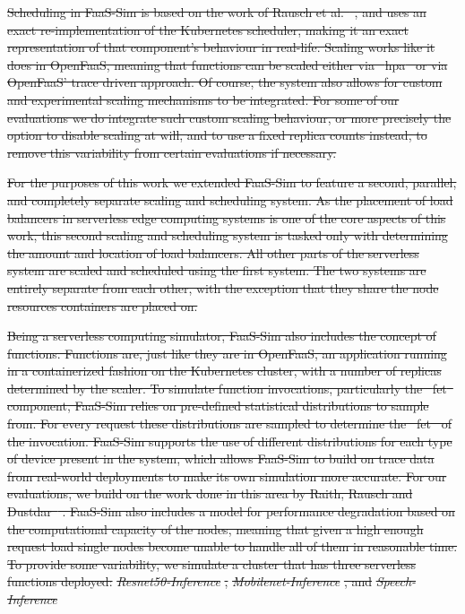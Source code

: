 \documentclass[draft,final]{vutinfth} %
\providecommand{\DIFdeltex}[1]{{\protect\color{red}\sout{#1}}}                      %
\providecommand{\DIFdel}[1]{\texorpdfstring{\DIFdeltex{#1}}{}} %
\begin{document}
\DIFdel{Scheduling in FaaS-Sim is based on the work of Rausch et al.\mbox{%
\cite{skippy}}\hskip0pt%
, and uses an exact re-implementation of the Kubernetes scheduler, making it an exact representation of that component's behaviour in real-life.
Scaling works like it does in OpenFaaS, meaning that functions can be scaled either via \mbox{%
\gls{hpa} }\hskip0pt%
or via OpenFaaS' trace driven approach.
Of course, the system also allows for custom and experimental scaling mechanisms to be integrated.
For some of our evaluations we do integrate such custom scaling behaviour, or more precisely the option to disable scaling at will, and to use a fixed replica counts instead, to remove this variability from certain evaluations if necessary.
}%

\DIFdel{For the purposes of this work we extended FaaS-Sim to feature a second, parallel, and completely separate scaling and scheduling system.
As the placement of load balancers in serverless edge computing systems is one of the core aspects of this work, this second scaling and scheduling system is tasked only with determining the amount and location of load balancers.
All other parts of the serverless system are scaled and scheduled using the first system.
The two systems are entirely separate from each other, with the exception that they share the node resources containers are placed on.
}%

\DIFdel{Being a serverless computing simulator, FaaS-Sim also includes the concept of functions.
Functions are, just like they are in OpenFaaS, an application running in a containerized fashion on the Kubernetes cluster, with a number of replicas determined by the scaler.
To simulate function invocations, particularly the \mbox{%
\gls{fet} }\hskip0pt%
component, FaaS-Sim relies on pre-defined statistical distributions to sample from.
For every request these distributions are sampled to determine the \mbox{%
\gls{fet} }\hskip0pt%
of the invocation.
FaaS-Sim supports the use of different distributions for each type of device present in the system, which allows FaaS-Sim to build on trace data from real-world deployments to make its own simulation more accurate.
For our evaluations, we build on the work done in this area by Raith, Rausch and Dustdar\mbox{%
\cite{philipp-da}}\hskip0pt%
.
FaaS-Sim also includes a model for performance degradation based on the computational capacity of the nodes, meaning that given a high enough request load single nodes become unable to handle all of them in reasonable time.
To provide some variability, we simulate a cluster that has three serverless functions deployed: }\textit{\DIFdel{Resnet50-Inference}}%
\DIFdel{, }\textit{\DIFdel{Mobilenet-Inference}}%
\DIFdel{, and }\textit{\DIFdel{Speech-Inference}}
\end{document}
